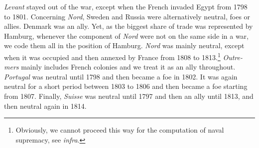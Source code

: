 \documentclass[12pt,a4paper,notitlepage,english]{article}
\begin{document}
\textit{Levant} stayed out of the war, except when the French invaded Egypt from 1798 to 1801.
Concerning \textit{Nord}, Sweden and Russia were alternatively neutral, foes or allies. Denmark was an ally. Yet, as the biggest share of trade was represented by Hamburg, whenever the component of \textit{Nord} were not on the same side in a war, we code them all in the position of Hamburg. \textit{Nord} was mainly neutral, except when it was occupied and then annexed by France from 1808 to 1813.\footnote{Obviously, we cannot proceed this way for the computation of naval supremacy, see \textit{infra}.}
\textit{Outre-mers} mainly includes French colonies and we treat it as an ally throughout.
\textit{Portugal} was neutral until 1798 and then became a foe in 1802.
It was again neutral for a short period between 1803 to 1806 and then became a foe starting from 1807.
Finally, \textit{Suisse} was neutral until 1797 and then an ally until 1813, and then neutral again in 1814. \\
\end{document}

